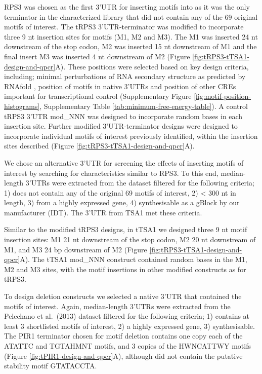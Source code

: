 \documentclass[../main.tex]{subfiles}
\begin{document}
RPS3 was chosen as the first 3'UTR for inserting motifs into as it was the only terminator in the characterized library that did not contain any of the 69 original motifs of interest.
The tRPS3 3'UTR-terminator was modified to incorporate three 9 nt insertion sites for motifs (M1, M2 and M3).
The M1 was inserted 24 nt downstream of the stop codon, M2 was inserted 15 nt downstream of M1 and the final insert M3 was inserted 4 nt downstream of M2 (Figure \ref{fig:tRPS3-tTSA1-design-and-qpcr}A).
These positions were selected based on key design criteria, including; minimal perturbations of RNA secondary structure as predicted by RNAfold \parencite{Lorenz2011}, position of motifs in native 3'UTRs and position of other CREs important for transcriptional control (Supplementary Figure \ref{fig:motif-position-histograms}, Supplementary Table \ref{tab:minimum-free-energy-table}).
A control tRPS3 3'UTR mod\_NNN was designed to incorporate random bases in each insertion site.
Further modified 3'UTR-terminator designs were designed to incorporate individual motifs of interest previously identified, within the insertion sites described (Figure \ref{fig:tRPS3-tTSA1-design-and-qpcr}A).

We chose an alternative 3'UTR for screening the effects of inserting motifs of interest by searching for characteristics similar to RPS3.
To this end, median-length 3'UTRs were extracted from the \parencite{Pelechano2013} dataset filtered for the following criteria; 1) does not contain any of the original 69 motifs of interest, 2) \textless{} 300 nt in length, 3) from a highly expressed gene, 4) synthesisable as a gBlock by our manufacturer (IDT). The 3'UTR from TSA1 met these criteria.

Similar to the modified tRPS3 designs, in tTSA1 we designed three 9 nt motif insertion sites: M1 21 nt downstream of the stop codon, M2 20 nt downstream of M1, and M3 24 bp downstream of M2 (Figure \ref{fig:tRPS3-tTSA1-design-and-qpcr}A).
The tTSA1 mod\_NNN construct contained random bases in the M1, M2 and M3 sites, with the motif insertions in other modified constructs as for tRPS3.

To design deletion constructs we selected a native 3'UTR that contained the motifs of interest.
Again, median-length 3'UTRs were extracted from the Pelechano et al.~(2013) dataset filtered for the following criteria; 1) contains at least 3 shortlisted motifs of interest, 2) a highly expressed gene, 3) synthesisable.
The PIR1 terminator chosen for motif deletion contains one copy each of the ATATTC and TGTAHMNT motifs, and 3 copies of the HWNCATTWY motifs (Figure \ref{fig:tPIR1-design-and-qpcr}A), although did not contain the putative stability motif GTATACCTA.
\end{document}
